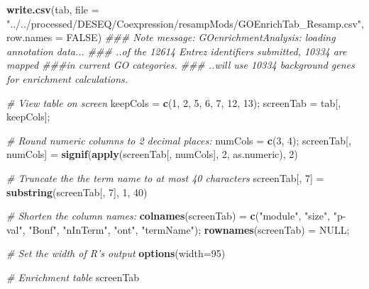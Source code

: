 \documentclass[]{article}
\newenvironment{Shaded}{\begin{snugshade}}{\end{snugshade}}
\newcommand{\CommentTok}[1]{\textcolor[rgb]{0.56,0.35,0.01}{\textit{#1}}}
\newcommand{\DataTypeTok}[1]{\textcolor[rgb]{0.13,0.29,0.53}{#1}}
\newcommand{\DecValTok}[1]{\textcolor[rgb]{0.00,0.00,0.81}{#1}}
\newcommand{\KeywordTok}[1]{\textcolor[rgb]{0.13,0.29,0.53}{\textbf{#1}}}
\newcommand{\NormalTok}[1]{#1}
\newcommand{\OtherTok}[1]{\textcolor[rgb]{0.56,0.35,0.01}{#1}}
\newcommand{\StringTok}[1]{\textcolor[rgb]{0.31,0.60,0.02}{#1}}
\begin{document}
\begin{Shaded}
\begin{Highlighting}[]
\KeywordTok{write.csv}\NormalTok{(tab, }\DataTypeTok{file =} \StringTok{"../../processed/DESEQ/Coexpression/resampMods/GOEnrichTab_Resamp.csv"}\NormalTok{, }
              \DataTypeTok{row.names =} \OtherTok{FALSE}\NormalTok{)}
\CommentTok{### Note message: GOenrichmentAnalysis: loading annotation data...}
\CommentTok{###  ..of the 12614  Entrez identifiers submitted, 10334 are mapped ###in current GO categories.}
\CommentTok{###  ..will use 10334 background genes for enrichment calculations.}

\CommentTok{# View table on screen}
\NormalTok{keepCols =}\StringTok{ }\KeywordTok{c}\NormalTok{(}\DecValTok{1}\NormalTok{, }\DecValTok{2}\NormalTok{, }\DecValTok{5}\NormalTok{, }\DecValTok{6}\NormalTok{, }\DecValTok{7}\NormalTok{, }\DecValTok{12}\NormalTok{, }\DecValTok{13}\NormalTok{);}
\NormalTok{screenTab =}\StringTok{ }\NormalTok{tab[, keepCols];}

\CommentTok{# Round numeric columns to 2 decimal places:}
\NormalTok{numCols =}\StringTok{ }\KeywordTok{c}\NormalTok{(}\DecValTok{3}\NormalTok{, }\DecValTok{4}\NormalTok{);}
\NormalTok{screenTab[, numCols] =}\StringTok{ }\KeywordTok{signif}\NormalTok{(}\KeywordTok{apply}\NormalTok{(screenTab[, numCols], }\DecValTok{2}\NormalTok{, as.numeric), }\DecValTok{2}\NormalTok{)}

\CommentTok{# Truncate the the term name to at most 40 characters}
\NormalTok{screenTab[, }\DecValTok{7}\NormalTok{] =}\StringTok{ }\KeywordTok{substring}\NormalTok{(screenTab[, }\DecValTok{7}\NormalTok{], }\DecValTok{1}\NormalTok{, }\DecValTok{40}\NormalTok{)}

\CommentTok{# Shorten the column names:}
\KeywordTok{colnames}\NormalTok{(screenTab) =}\StringTok{ }\KeywordTok{c}\NormalTok{(}\StringTok{"module"}\NormalTok{, }\StringTok{"size"}\NormalTok{, }\StringTok{"p-val"}\NormalTok{, }\StringTok{"Bonf"}\NormalTok{, }\StringTok{"nInTerm"}\NormalTok{, }\StringTok{"ont"}\NormalTok{, }\StringTok{"termName"}\NormalTok{);}
\KeywordTok{rownames}\NormalTok{(screenTab) =}\StringTok{ }\OtherTok{NULL}\NormalTok{;}

\CommentTok{# Set the width of R’s output}
\KeywordTok{options}\NormalTok{(}\DataTypeTok{width=}\DecValTok{95}\NormalTok{)}

\CommentTok{# Enrichment table}
\NormalTok{screenTab}
\end{Highlighting}
\end{Shaded}
\end{document}
